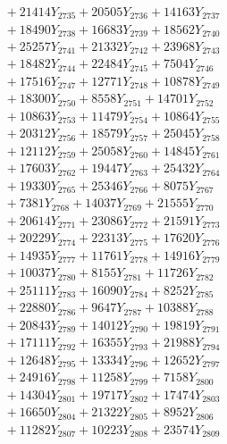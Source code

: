 \documentclass[a4paper,10pt]{article}
\begin{document}
{\begin{align}
&\;  + 21414 Y_{2735} + 20505 Y_{2736} + 14163 Y_{2737} \\[0.3ex]
&\;  + 18490 Y_{2738} + 16683 Y_{2739} + 18562 Y_{2740} \\[0.3ex]
&\;  + 25257 Y_{2741} + 21332 Y_{2742} + 23968 Y_{2743} \\[0.3ex]
&\;  + 18482 Y_{2744} + 22484 Y_{2745} + 7504 Y_{2746} \\[0.3ex]
&\;  + 17516 Y_{2747} + 12771 Y_{2748} + 10878 Y_{2749} \\[0.3ex]
&\;  + 18300 Y_{2750} + 8558 Y_{2751} + 14701 Y_{2752} \\[0.3ex]
&\;  + 10863 Y_{2753} + 11479 Y_{2754} + 10864 Y_{2755} \\[0.3ex]
&\;  + 20312 Y_{2756} + 18579 Y_{2757} + 25045 Y_{2758} \\[0.5ex]\allowbreak
&\;  + 12112 Y_{2759} + 25058 Y_{2760} + 14845 Y_{2761} \\[0.3ex]
&\;  + 17603 Y_{2762} + 19447 Y_{2763} + 25432 Y_{2764} \\[0.3ex]
&\;  + 19330 Y_{2765} + 25346 Y_{2766} + 8075 Y_{2767} \\[0.3ex]
&\;  + 7381 Y_{2768} + 14037 Y_{2769} + 21555 Y_{2770} \\[0.3ex]
&\;  + 20614 Y_{2771} + 23086 Y_{2772} + 21591 Y_{2773} \\[0.3ex]
&\;  + 20229 Y_{2774} + 22313 Y_{2775} + 17620 Y_{2776} \\[0.3ex]
&\;  + 14935 Y_{2777} + 11761 Y_{2778} + 14916 Y_{2779} \\[0.3ex]
&\;  + 10037 Y_{2780} + 8155 Y_{2781} + 11726 Y_{2782} \\[0.3ex]
&\;  + 25111 Y_{2783} + 16090 Y_{2784} + 8252 Y_{2785} \\[0.3ex]
&\;  + 22880 Y_{2786} + 9647 Y_{2787} + 10388 Y_{2788} \\[0.5ex]\allowbreak
&\;  + 20843 Y_{2789} + 14012 Y_{2790} + 19819 Y_{2791} \\[0.3ex]
&\;  + 17111 Y_{2792} + 16355 Y_{2793} + 21988 Y_{2794} \\[0.3ex]
&\;  + 12648 Y_{2795} + 13334 Y_{2796} + 12652 Y_{2797} \\[0.3ex]
&\;  + 24916 Y_{2798} + 11258 Y_{2799} + 7158 Y_{2800} \\[0.3ex]
&\;  + 14304 Y_{2801} + 19717 Y_{2802} + 17474 Y_{2803} \\[0.3ex]
&\;  + 16650 Y_{2804} + 21322 Y_{2805} + 8952 Y_{2806} \\[0.3ex]
&\;  + 11282 Y_{2807} + 10223 Y_{2808} + 23574 Y_{2809} \\[0.3ex]

\end{align}}
\end{document}
